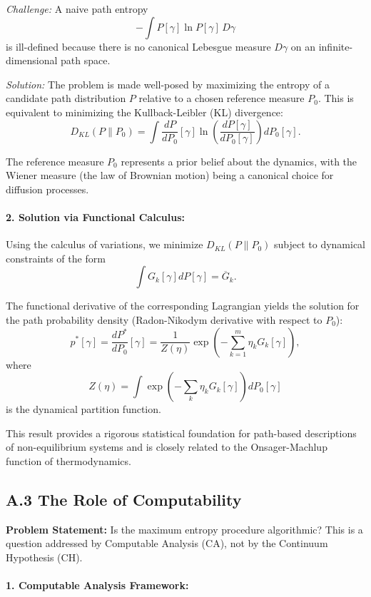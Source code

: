 \documentclass[12pt, a4paper]{article}
\begin{document}
\emph{Challenge:} A naive path entropy
\[
- \int P[\gamma] \ln P[\gamma] \, D\gamma
\]
is ill-defined because there is no canonical Lebesgue measure \(D\gamma\) on an infinite-dimensional path space.

\emph{Solution:} The problem is made well-posed by maximizing the entropy of a candidate path distribution \( P \) relative to a chosen reference measure \( P_0 \). This is equivalent to minimizing the Kullback-Leibler (KL) divergence:
\[
D_{KL}(P \| P_0) = \int \frac{dP}{dP_0}[\gamma] \ln \left(\frac{dP[\gamma]}{dP_0[\gamma]}\right) dP_0[\gamma].
\]

The reference measure \(P_0\) represents a prior belief about the dynamics, with the Wiener measure (the law of Brownian motion) being a canonical choice for diffusion processes.

\paragraph{2. Solution via Functional Calculus:}

Using the calculus of variations, we minimize \( D_{KL}(P \| P_0) \) subject to dynamical constraints of the form
\[
\int G_k[\gamma] dP[\gamma] = \overline{G}_k.
\]

The functional derivative of the corresponding Lagrangian yields the solution for the path probability density (Radon-Nikodym derivative with respect to \(P_0\)):
\[
p^*[\gamma] = \frac{dP^*}{dP_0}[\gamma] = \frac{1}{Z(\eta)} \exp \left( - \sum_{k=1}^m \eta_k G_k[\gamma] \right),
\]
where
\[
Z(\eta) = \int \exp\left( - \sum_k \eta_k G_k[\gamma] \right) dP_0[\gamma]
\]
is the dynamical partition function.

This result provides a rigorous statistical foundation for path-based descriptions of non-equilibrium systems and is closely related to the Onsager-Machlup function of thermodynamics.

\subsection*{A.3 The Role of Computability}

\textbf{Problem Statement:} Is the maximum entropy procedure algorithmic? This is a question addressed by Computable Analysis (CA), not by the Continuum Hypothesis (CH).

\paragraph{1. Computable Analysis Framework:}
\end{document}

